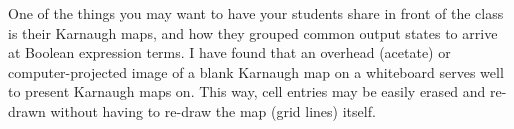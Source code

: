 
One of the things you may want to have your students share in front of the class is their Karnaugh maps, and how they grouped common output states to arrive at Boolean expression terms.  I have found that an overhead (acetate) or computer-projected image of a blank Karnaugh map on a whiteboard serves well to present Karnaugh maps on.  This way, cell entries may be easily erased and re-drawn without having to re-draw the map (grid lines) itself.




